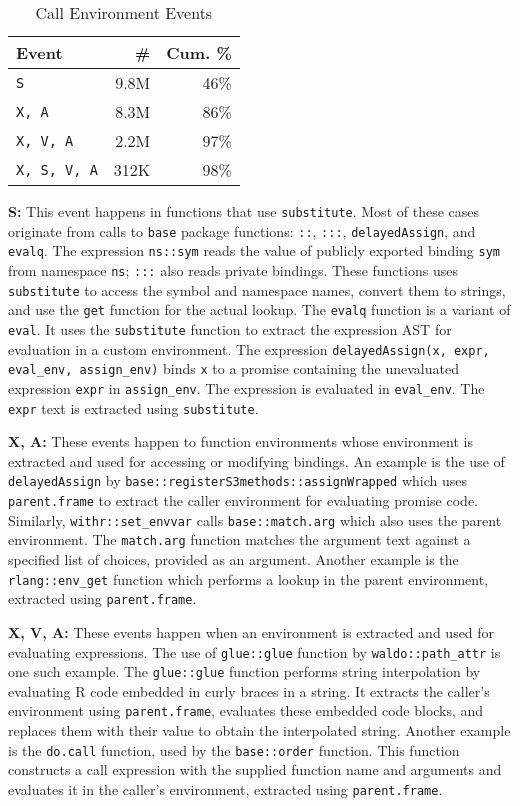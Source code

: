 \documentclass[10pt,review,sigplan,authorversion=true]{acmart}
\newcommand{\code}[1]{\lstinline |#1|\xspace}
\newcommand{\base}{\code{base}}
\newcommand{\eval}{\code{eval}}
\newcommand{\substitute}{\code{substitute}}
\begin{document}
\begin{table}[!h]  \small
  \caption{Call Environment Events} \label{table:call_env_seq}  \centering
  \begin{tabular}{lrr}    \toprule
    \textbf{Event}&\textbf{\#}&\textbf{Cum. \%}\\
    \midrule
    \texttt{S}&          9.8M & 46\%\\
    \texttt{X, A}&       8.3M & 86\%\\
    \texttt{X, V, A}&    2.2M & 97\%\\
    \texttt{X, S, V, A}& 312K & 98\%\\
    \bottomrule
  \end{tabular}
\end{table}

\noindent
\textbf{S:} This event happens in functions that use \code{substitute}.
  Most of these cases originate from calls to \base package functions:
  \code{::}, \code{:::}, \code{delayedAssign}, and \code{evalq}. The expression
  \code{ns::sym} reads the value of publicly exported binding \code{sym} from
  namespace \code{ns}; \code{:::} also reads private bindings. These functions
  uses \substitute to access the symbol and namespace names, convert them to
  strings, and use the \code{get} function for the actual lookup. The
  \code{evalq} function is a variant of \eval. It uses the \substitute function
  to extract the expression AST for evaluation in a custom environment. The
  expression \code{delayedAssign(x, expr, eval_env, assign_env)} binds \code{x}
  to a promise containing the unevaluated expression \code{expr} in
  \code{assign_env}. The expression is evaluated in \code{eval_env}. The
  \code{expr} text is extracted using \code{substitute}.

\noindent
\textbf{X, A:} These events happen to function environments whose
  environment is extracted and used for accessing or modifying bindings. An
  example is the use of \code{delayedAssign} by
  \code{base::registerS3methods::assignWrapped} which uses \code{parent.frame}
  to extract the caller environment for evaluating promise code. Similarly,
  \code{withr::set_envvar} calls \code{base::match.arg} which also uses the
  parent environment. The \code{match.arg} function matches the argument text
  against a specified list of choices, provided as an argument. Another example
  is the \code{rlang::env_get} function which performs a lookup in the parent
  environment, extracted using \code{parent.frame}.

\noindent
\textbf{X, V, A:} These events happen when an environment is extracted
  and used for evaluating expressions. The use of \code{glue::glue} function by
  \code{waldo::path_attr} is one such example. The \code{glue::glue} function
  performs string interpolation by evaluating R code embedded in curly braces in
  a string. It extracts the caller's environment using \code{parent.frame},
  evaluates these embedded code blocks, and replaces them with their value to
  obtain the interpolated string. Another example is the \code{do.call}
  function, used by the \code{base::order} function. This function constructs a
  call expression with the supplied function name and arguments and evaluates it
  in the caller's environment, extracted using \code{parent.frame}.
\end{document}
